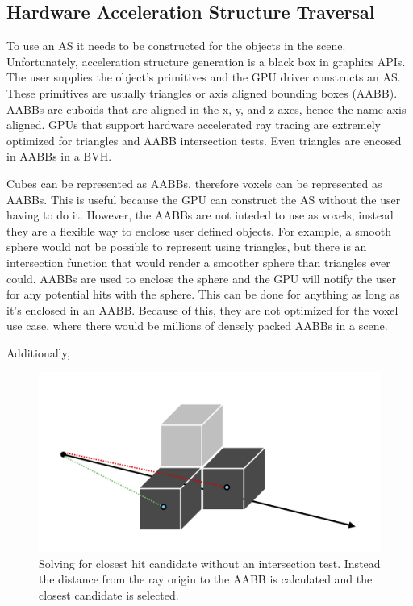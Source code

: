 \documentclass[12pt]{article}
\begin{document}
\subsection{Hardware Acceleration Structure Traversal}

To use an AS it needs to be constructed for the objects in the scene.
Unfortunately, acceleration structure generation is a black box in graphics APIs. 
The user supplies the object's primitives and the GPU driver constructs an AS.
These primitives are usually triangles or axis aligned bounding boxes (AABB).
AABBs are cuboids that are aligned in the x, y, and z axes, hence the name axis aligned.
GPUs that support hardware accelerated ray tracing are extremely optimized for triangles and AABB intersection tests.
Even triangles are encosed in AABBs in a BVH.

Cubes can be represented as AABBs, therefore voxels can be represented as AABBs.
This is useful because the GPU can construct the AS without the user having to do it.
However, the AABBs are not inteded to use as voxels, instead they are a flexible way to enclose user defined objects.
For example, a smooth sphere would not be possible to represent using triangles, but there 
is an intersection function that would render a smoother sphere than triangles ever could.
AABBs are used to enclose the sphere and the GPU will notify the user for any potential hits with the sphere.
This can be done for anything as long as it's enclosed in an AABB.
Because of this, they are not optimized for the voxel use case, where there would be millions of
densely packed AABBs in a scene.

Additionally, 

\begin{figure}[h]
    \begin{center}
        \includegraphics[scale=0.22]{ClosestHit-Approx}
    \end{center}
    \caption{
        Solving for closest hit candidate without an intersection test.
        Instead the distance from the ray origin to the AABB is calculated and the closest candidate is selected.}
    \label{fig:ClosestHit-Approx}
\end{figure}
\end{document}
